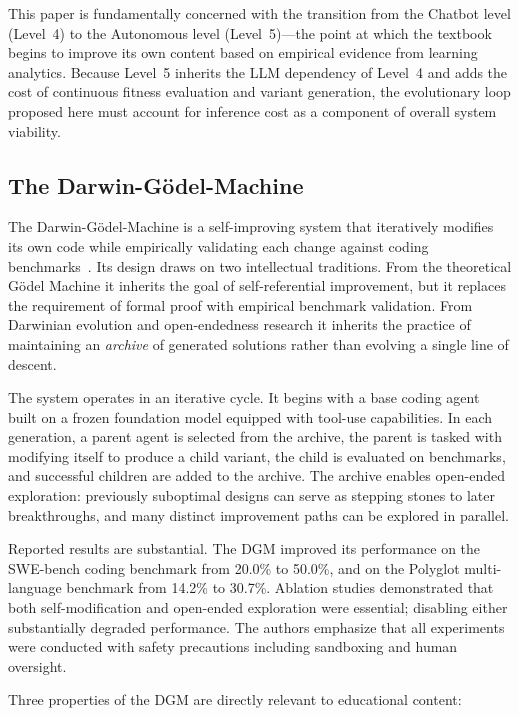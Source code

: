 This paper is fundamentally concerned with the transition from the Chatbot
level (Level~4) to the Autonomous level (Level~5)---the point at which the
textbook begins to improve its own content based on empirical evidence from
learning analytics. Because Level~5 inherits the LLM dependency of Level~4
and adds the cost of continuous fitness evaluation and variant generation,
the evolutionary loop proposed here must account for inference cost as a
component of overall system viability.

\subsection{The Darwin-G\"{o}del-Machine}

The Darwin-G\"{o}del-Machine is a self-improving system that iteratively
modifies its own code while empirically validating each change against coding
benchmarks~\cite{zhang2025dgm}. Its design draws on two intellectual
traditions. From the theoretical G\"{o}del Machine it inherits the goal of
self-referential improvement, but it replaces the requirement of formal proof
with empirical benchmark validation. From Darwinian evolution and
open-endedness research it inherits the practice of maintaining an
\textit{archive} of generated solutions rather than evolving a single line of
descent.

The system operates in an iterative cycle. It begins with a base coding agent
built on a frozen foundation model equipped with tool-use capabilities. In
each generation, a parent agent is selected from the archive, the parent is
tasked with modifying itself to produce a child variant, the child is
evaluated on benchmarks, and successful children are added to the archive. The
archive enables open-ended exploration: previously suboptimal designs can serve
as stepping stones to later breakthroughs, and many distinct improvement paths
can be explored in parallel.

Reported results are substantial. The DGM improved its performance on the
SWE-bench coding benchmark from 20.0\% to 50.0\%, and on the Polyglot
multi-language benchmark from 14.2\% to 30.7\%. Ablation studies demonstrated
that both self-modification and open-ended exploration were essential;
disabling either substantially degraded performance. The authors emphasize that
all experiments were conducted with safety precautions including sandboxing and
human oversight.

Three properties of the DGM are directly relevant to educational content:

